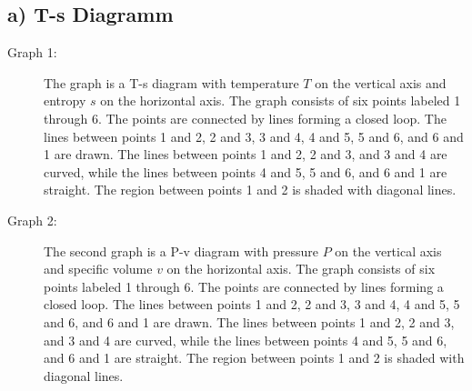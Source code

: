 \subsection*{a) T-s Diagramm}

\begin{description}
    \item[Graph 1:] The graph is a T-s diagram with temperature \( T \) on the vertical axis and entropy \( s \) on the horizontal axis. The graph consists of six points labeled 1 through 6. The points are connected by lines forming a closed loop. The lines between points 1 and 2, 2 and 3, 3 and 4, 4 and 5, 5 and 6, and 6 and 1 are drawn. The lines between points 1 and 2, 2 and 3, and 3 and 4 are curved, while the lines between points 4 and 5, 5 and 6, and 6 and 1 are straight. The region between points 1 and 2 is shaded with diagonal lines.
    \item[Graph 2:] The second graph is a P-v diagram with pressure \( P \) on the vertical axis and specific volume \( v \) on the horizontal axis. The graph consists of six points labeled 1 through 6. The points are connected by lines forming a closed loop. The lines between points 1 and 2, 2 and 3, 3 and 4, 4 and 5, 5 and 6, and 6 and 1 are drawn. The lines between points 1 and 2, 2 and 3, and 3 and 4 are curved, while the lines between points 4 and 5, 5 and 6, and 6 and 1 are straight. The region between points 1 and 2 is shaded with diagonal lines.
\end{description}
